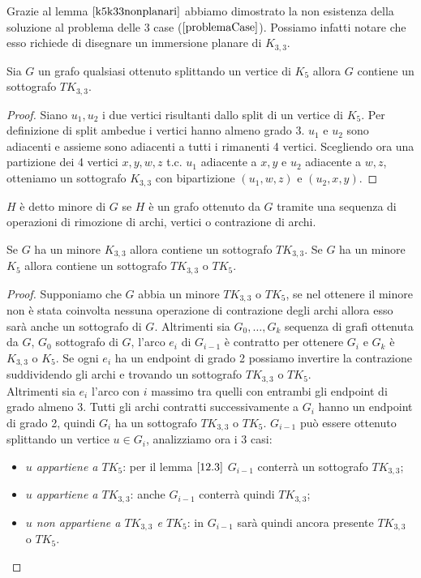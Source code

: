 Grazie al lemma \(\ref{k5k33nonplanari}\) abbiamo dimostrato la non esistenza della soluzione al problema delle 3 case (\(\ref{problemaCase}\)). Possiamo infatti notare che esso richiede di disegnare un immersione planare di \(K_{3,3}\).
\begin{lemma}\label{12.3}
    Sia \(G\) un grafo qualsiasi ottenuto splittando un vertice di \(K_5\) allora \(G\) contiene un sottografo \(TK_{3,3}\).
    \begin{proof}
        Siano \(u_1, u_2\) i due vertici risultanti dallo split di un vertice di \(K_5\). Per definizione di split ambedue i vertici hanno almeno grado 3. \(u_1\) e \(u_2\) sono adiacenti e assieme sono adiacenti a tutti i rimanenti 4 vertici. Scegliendo ora una partizione dei 4 vertici \(x,y,w,z\) t.c. \(u_1\) adiacente a \(x,y\) e \(u_2\) adiacente a \(w,z\), otteniamo un sottografo \(K_{3,3}\) con bipartizione \((u_1, w, z)\) e \((u_2,x,y)\).
    \end{proof}
\end{lemma}
\begin{definizione}[Minore]
    \(H\) è detto minore di \(G\) se \(H\) è un grafo ottenuto da \(G\) tramite una sequenza di operazioni di rimozione di archi, vertici o contrazione di archi.
\end{definizione}
\begin{teorema}\label{minoreTK5}
    Se \(G\) ha un minore \(K_{3,3}\) allora contiene un sottografo \(TK_{3,3}\). Se \(G\) ha un minore \(K_5\) allora contiene un sottografo \(TK_{3,3}\) o \(TK_5\).
    \begin{proof}
        Supponiamo che \(G\) abbia un minore \(TK_{3,3}\) o \(TK_5\), se nel ottenere il minore non è stata coinvolta nessuna operazione di contrazione degli archi allora esso sarà anche un sottografo di \(G\). Altrimenti sia \(G_0,\dots, G_k\) sequenza di grafi ottenuta da \(G\), \(G_0\) sottografo di \(G\), l'arco \(e_i\) di \(G_{i-1}\) è contratto per ottenere \(G_i\) e \(G_k\) è \(K_{3,3}\) o \(K_5\).
        Se ogni \(e_i\) ha un endpoint di grado 2 possiamo invertire la contrazione suddividendo gli archi e trovando un sottografo \(TK_{3,3}\) o \(TK_5\). 
        \\ Altrimenti sia \(e_i\) l'arco con \(i\) massimo tra quelli con entrambi gli endpoint di grado almeno 3. Tutti gli archi contratti successivamente a \(G_i\) hanno un endpoint di grado 2, quindi \(G_i\) ha un sottografo \(TK_{3,3}\) o \(TK_5\). \(G_{i-1}\) può essere ottenuto splittando un vertice \(u \in G_i\), analizziamo ora i 3 casi:
        \begin{itemize}
            \item \textit{\(u\) appartiene a \(TK_5\)}: per il lemma \(\ref{12.3}\) \(G_{i-1}\) conterrà un sottografo \(TK_{3,3}\);
            \item \textit{\(u\) appartiene a \(TK_{3,3}\)}: anche \(G_{i-1}\) conterrà quindi \(TK_{3,3}\);
            \item \textit{\(u\) non appartiene a \(TK_{3,3}\) e \(TK_5\)}: in \(G_{i-1}\) sarà quindi ancora presente \(TK_{3,3}\) o \(TK_5\).
        \end{itemize}
    \end{proof}
\end{teorema}
